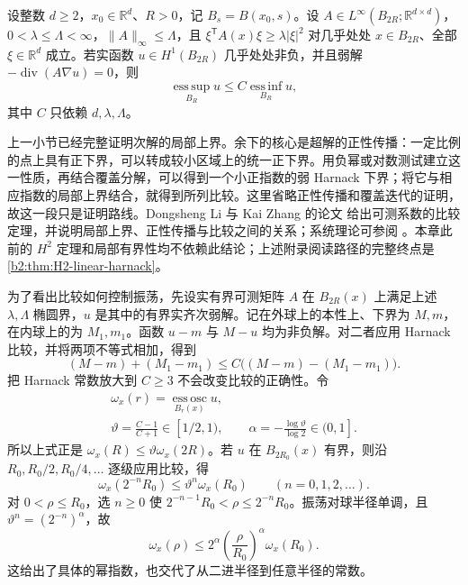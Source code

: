 \begin{theorem}
\label{b2:thm:16-measurable-harnack}
设整数 \(d\geq2\)，\(x_0\in\mathbb R^d\)、\(R>0\)，记 \(B_s=B(x_0,s)\)。设 \(A\in L^\infty(B_{2R};\mathbb R^{d\times d})\)，\(0<\lambda\leq\Lambda<\infty\)，\(\|A\|_\infty\leq\Lambda\)，且 \(\xi^{\mathsf T}A(x)\xi\geq\lambda|\xi|^2\) 对几乎处处 \(x\in B_{2R}\)、全部 \(\xi\in\mathbb R^d\) 成立。若实函数 \(u\in H^1(B_{2R})\) 几乎处处非负，并且弱解 \(-\operatorname{div}(A\nabla u)=0\)，则
\[\operatorname*{ess\,sup}_{B_R}u\le C\operatorname*{ess\,inf}_{B_R}u,\]
其中 \(C\) 只依赖 \(d,\lambda,\Lambda\)。
\end{theorem}
\begin{proofsketch}
上一小节已经完整证明次解的局部上界。余下的核心是超解的正性传播：一定比例的点上具有正下界，可以转成较小区域上的统一正下界。用负幂或对数测试建立这一性质，再结合覆盖分解，可以得到一个小正指数的弱 Harnack 下界；将它与相应指数的局部上界结合，就得到所列比较。这里省略正性传播和覆盖迭代的证明，故这一段只是证明路线。Dongsheng Li 与 Kai Zhang 的论文 \cite[Theorem 1.1 and Section 2]{Li2017Harnack} 给出可测系数的比较定理，并说明局部上界、正性传播与比较之间的关系；系统理论可参阅 \cite[Chapter 8]{Gilbarg2001Elliptic}。本章此前的 \(H^2\) 定理和局部有界性均不依赖此结论；上述附录阅读路径的完整终点是\cref{b2:thm:H2-linear-harnack}。
\end{proofsketch}

为了看出比较如何控制振荡，先设实有界可测矩阵 \(A\) 在 \(B_{2R}(x)\) 上满足上述 \(\lambda,\Lambda\) 椭圆界，\(u\) 是其中的有界实齐次弱解。记在外球上的本性上、下界为 \(M,m\)，在内球上的为 \(M_1,m_1\)。函数 \(u-m\) 与 \(M-u\) 均为非负解。对二者应用 Harnack 比较，并将两项不等式相加，得到
\[(M-m)+(M_1-m_1)\le C\bigl((M-m)-(M_1-m_1)\bigr).\]
把 Harnack 常数放大到 \(C\geq3\) 不会改变比较的正确性。令
\[
 \begin{gathered}
 \omega_x(r)=\operatorname*{ess\,osc}_{B_r(x)}u,\\
 \vartheta=\frac{C-1}{C+1}\in[1/2,1),
 \qquad\alpha=-\frac{\log\vartheta}{\log2}\in(0,1].
 \end{gathered}
\]
所以上式正是 \(\omega_x(R)\leq\vartheta\omega_x(2R)\)。若 \(u\) 在 \(B_{2R_0}(x)\) 有界，则沿 \(R_0,R_0/2,R_0/4,\ldots\) 逐级应用比较，得
\[\omega_x(2^{-n}R_0)\leq\vartheta^n\omega_x(R_0)
       \qquad(n=0,1,2,\ldots).\]
对 \(0<\rho\leq R_0\)，选 \(n\geq0\) 使 \(2^{-n-1}R_0<\rho\leq2^{-n}R_0\)。振荡对球半径单调，且 \(\vartheta^n=(2^{-n})^\alpha\)，故
\[
 \omega_x(\rho)\leq2^\alpha
       \left(\frac{\rho}{R_0}\right)^\alpha\omega_x(R_0).
\]
这给出了具体的幂指数，也交代了从二进半径到任意半径的常数。

